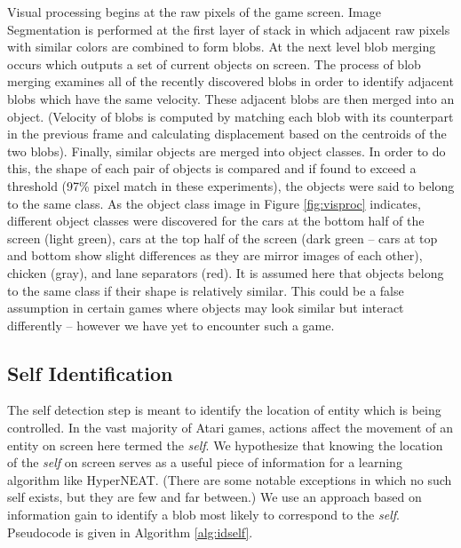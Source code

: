 \documentclass{acm_proc_article-sp}
\begin{document}
Visual processing begins at the raw pixels of the game screen. Image Segmentation is performed at the first layer of stack in which adjacent raw pixels with similar colors are combined to form blobs. At the next level blob merging occurs which outputs a set of current objects on screen. The process of blob merging examines all of the recently discovered blobs in order to identify adjacent blobs which have the same velocity. These adjacent blobs are then merged into an object. (Velocity of blobs is computed by matching each blob with its counterpart in the previous frame and calculating displacement based on the centroids of the two blobs). Finally, similar objects are merged into object classes. In order to do this, the shape of each pair of objects is compared and if found to exceed a threshold (97\% pixel match in these experiments), the objects were said to belong to the same class. As the object class image in Figure \ref{fig:visproc} indicates, different object classes were discovered for the cars at the bottom half of the screen (light green), cars at the top half of the screen (dark green -- cars at top and bottom show slight differences as they are mirror images of each other), chicken (gray), and lane separators (red). It is assumed here that objects belong to the same class if their shape is relatively similar. This could be a false assumption in certain games where objects may look similar but interact differently -- however we have yet to encounter such a game.

\subsection{Self Identification}
The self detection step is meant to identify the location of entity which is being controlled. In the vast majority of Atari games, actions affect the movement of an entity on screen here termed the \textit{self}. We hypothesize that knowing the location of the \textit{self} on screen serves as a useful piece of information for a learning algorithm like HyperNEAT. (There are some notable exceptions in which no such self exists, but they are few and far between.) We use an approach based on information gain to identify a blob most likely to correspond to the \textit{self}. Pseudocode is given in Algorithm \ref{alg:idself}.
\end{document}

